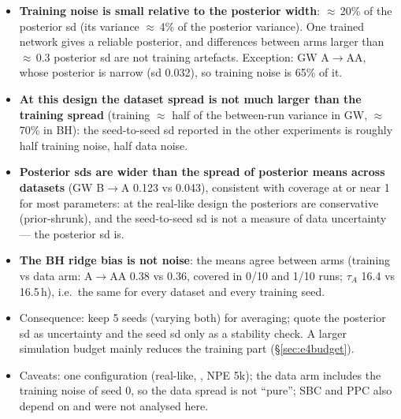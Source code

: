 \documentclass[10pt,a4paper]{article}
\newcommand{\tA}{$\tau_A$}
\newcommand{\code}[1]{\texttt{\detokenize{#1}}}
\begin{document}
\begin{itemize}
\item \textbf{Training noise is small relative to the posterior width}: $\approx$\,20\% of the posterior sd (its variance $\approx$\,4\% of the posterior variance). One trained network gives a reliable posterior, and differences between arms larger than $\approx$\,0.3 posterior sd are not training artefacts. Exception: GW A$\to$AA, whose posterior is narrow (sd 0.032), so training noise is 65\% of it.
\item \textbf{At this design the dataset spread is not much larger than the training spread} (training $\approx$ half of the between-run variance in GW, $\approx$\,70\% in BH): the seed-to-seed sd reported in the other experiments is roughly half training noise, half data noise.
\item \textbf{Posterior sds are wider than the spread of posterior means across datasets} (GW B$\to$A 0.123 vs 0.043), consistent with coverage at or near 1 for most parameters: at the real-like design the posteriors are conservative (prior-shrunk), and the seed-to-seed sd is not a measure of data uncertainty --- the posterior sd is.
\item \textbf{The BH ridge bias is not noise}: the means agree between arms (training vs data arm: A$\to$AA 0.38 vs 0.36, covered in 0/10 and 1/10 runs; \tA{} 16.4 vs 16.5\,h), i.e.\ the same for every dataset and every training seed.
\item Consequence: keep 5 seeds (varying both) for averaging; quote the posterior sd as uncertainty and the seed sd only as a stability check. A larger simulation budget mainly reduces the training part (\S\ref{sec:e4budget}).
\item Caveats: one configuration (real-like, \code{reversible_ab}, NPE 5k); the data arm includes the training noise of seed 0, so the data spread is not ``pure''; SBC and PPC also depend on \code{seed} and were not analysed here.
\end{itemize}

\end{document}
